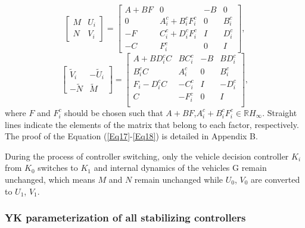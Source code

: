 \documentclass[trsc,nonblindrev]{informs3} %
\begin{document}
\begin{equation}
    \left[\begin{array}{cc}
            M & U_{i} \\
            N & V_{i}
        \end{array}\right]=\left[\begin{array}{cc|cc}
            A+B F     & 0                             & -B & 0         \\
            0         & A_{i}^{c}+B_{i}^{c} F_{i}^{c} & 0  & B_{i}^{c} \\
            \hline -F & C_{i}^{c}+D_{i}^{c} F_{i}^{c} & I  & D_{i}^{c} \\
            -C        & F_{i}^{c}                     & 0  & I
        \end{array}\right],
    \label{Eq17}
\end{equation}
\begin{equation}
    \left[\begin{array}{cc}
            \tilde{V}_{i} & -\tilde{U}_{i} \\
            -\tilde{N}    & \tilde{M}
        \end{array}\right]=\left[\begin{array}{cc|cc}
            A+B  D_{i}^{c} C          & B  C_{i}^{c} & -B & B  D_{i}^{c} \\
            B_{i}^{c} C               & A_{i}^{c}    & 0  & B_{i}^{c}    \\
            \hline F_{i}- D_{i}^{c} C & -C_{i}^{c}   & I  & -D_{i}^{c}   \\
            C                         & -F_{i}^{c}   & 0  & I            \\
        \end{array}\right],
    \label{Eq18}
\end{equation}
where $F$ and $F_i^c$ should be chosen such that $A+BF$,$A_i^c+B_i^c F_i^c\in \mathbb{R} H_{\infty}$. Straight lines indicate the elements of the matrix that belong to each factor, respectively. The proof of the Equation (\ref{Eq17}-\ref{Eq18}) is detailed in Appendix B.

During the process of controller switching, only the vehicle decision controller $K_i$ from $K_0$ switches to $K_1$ and internal dynamics of the vehicles G remain unchanged, which means $M$ and $N$ remain unchanged while $U_0$, $V_0$ are converted to $U_1$, $V_1$.

\subsubsection{YK parameterization of all stabilizing controllers}
\label{Section 3.2.3}
\end{document}
